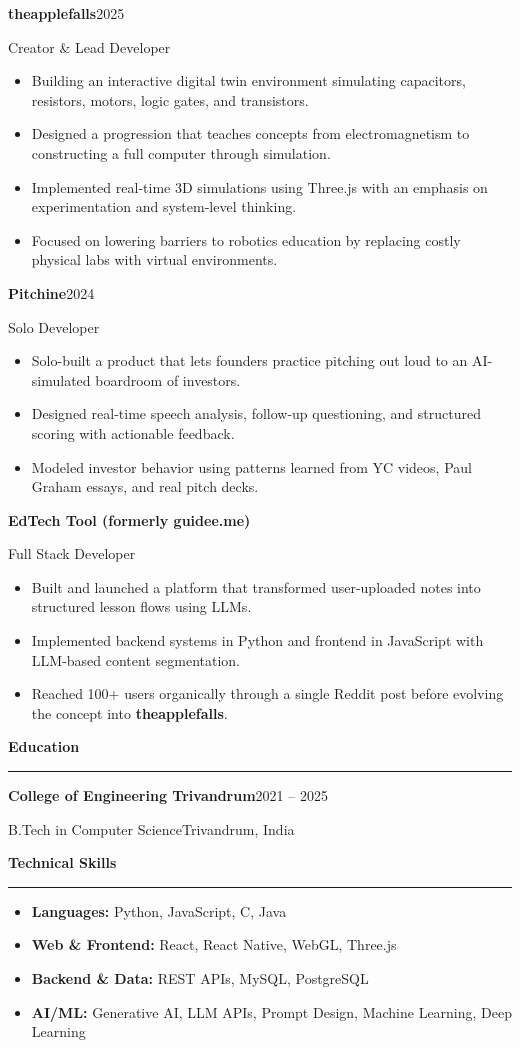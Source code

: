 \documentclass[10pt,a4paper]{article}
\newcommand{\cvsection}[1]{%
  \par\vspace{14pt}%
  {\large\bfseries #1\par}%
  \vspace{-7.2pt}%
  \noindent\rule{\linewidth}{0.4pt}\par
  \vspace{-1pt}%
}
\newcommand{\entry}[4]{%
  {\bfseries #1}\hfill #4\par
  \vspace{1pt}%
  #2\hfill #3\par
  \vspace{1pt}%
}
\begin{document}
\entry{theapplefalls}{Creator \& Lead Developer}{}{2025}
\begin{itemize}
  \item Building an interactive digital twin environment simulating capacitors, resistors, motors, logic gates, and transistors.
  \item Designed a progression that teaches concepts from electromagnetism to constructing a full computer through simulation.
  \item Implemented real-time 3D simulations using Three.js with an emphasis on experimentation and system-level thinking.
  \item Focused on lowering barriers to robotics education by replacing costly physical labs with virtual environments.
\end{itemize}

\entry{Pitchine}{Solo Developer}{}{2024}
\begin{itemize}
  \item Solo-built a product that lets founders practice pitching out loud to an AI-simulated boardroom of investors.
  \item Designed real-time speech analysis, follow-up questioning, and structured scoring with actionable feedback.
  \item Modeled investor behavior using patterns learned from YC videos, Paul Graham essays, and real pitch decks.
\end{itemize}

\entry{EdTech Tool (formerly guidee.me)}{Full Stack Developer}{}{}
\begin{itemize}
  \item Built and launched a platform that transformed user-uploaded notes into structured lesson flows using LLMs.
  \item Implemented backend systems in Python and frontend in JavaScript with LLM-based content segmentation.
  \item Reached 100+ users organically through a single Reddit post before evolving the concept into \textbf{theapplefalls}.
\end{itemize}

\cvsection{Education}
\entry{College of Engineering Trivandrum}{B.Tech in Computer Science}{Trivandrum, India}{2021 -- 2025}

\cvsection{Technical Skills}
\begin{itemize}[leftmargin=10.8pt,label={},labelsep=0pt,itemsep=0pt,topsep=0pt]
  \item \textbf{Languages:} Python, JavaScript, C, Java
  \item \textbf{Web \& Frontend:} React, React Native, WebGL, Three.js
  \item \textbf{Backend \& Data:} REST APIs, MySQL, PostgreSQL
  \item \textbf{AI/ML:} Generative AI, LLM APIs, Prompt Design, Machine Learning, Deep Learning
\end{itemize}
\end{document}
